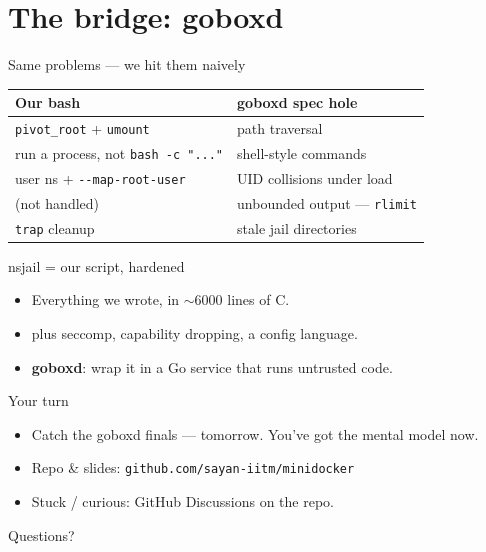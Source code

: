 \documentclass[10pt,aspectratio=169]{beamer}
\newcommand{\cmd}[1]{\texttt{\small #1}}
\begin{document}
\section{The bridge: goboxd}

\begin{frame}{Same problems — we hit them naively}
  \begin{center}
  \begin{tabular}{ll}
    \toprule
    \textbf{Our bash} & \textbf{goboxd spec hole} \\
    \midrule
    \cmd{pivot\_root} + \cmd{umount}   & path traversal \\
    run a process, not \cmd{bash -c "..."} & shell-style commands \\
    user ns + \cmd{-{}-map-root-user}   & UID collisions under load \\
    (not handled)                       & unbounded output — \cmd{rlimit} \\
    \cmd{trap} cleanup                  & stale jail directories \\
    \bottomrule
  \end{tabular}
  \end{center}
\end{frame}

\begin{frame}{nsjail = our script, hardened}
  \begin{itemize}
    \item Everything we wrote, in $\sim$6000 lines of C.
    \item \alert{plus} seccomp, capability dropping, a config language.
    \item \textbf{goboxd}: wrap it in a Go service that runs untrusted code.
  \end{itemize}
\end{frame}

\begin{frame}{Your turn}
  \begin{itemize}
    \item Catch the \alert{goboxd} finals — tomorrow. You've got the mental model now.
    \item Repo \& slides: \cmd{github.com/sayan-iitm/minidocker}
    \item Stuck / curious: GitHub Discussions on the repo.
  \end{itemize}
\end{frame}

\begin{frame}[standout]
  Questions?
\end{frame}
\end{document}

